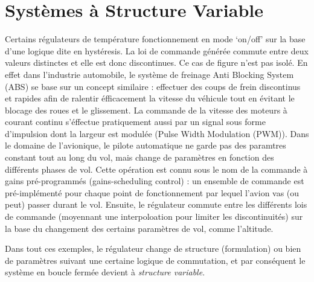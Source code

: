 \section{Systèmes à Structure Variable}
Certains régulateurs de température fonctionnement en mode ‘on/off’ sur la base d'une logique dite en  hystéresis. La loi de commande générée commute entre deux valeurs distinctes et elle est donc discontinues. Ce cas de figure n'est pas isolé. En effet dans l'industrie automobile, le système de freinage Anti Blocking System (ABS) se base sur un concept similaire : effectuer des coups de frein discontinus et rapides afin de ralentir éfficacement la vitesse du véhicule tout en évitant le blocage des roues et le glissement. La commande de la vitesse des moteurs à courant continu s'éffectue pratiquement aussi par un signal sous forme d'impulsion dont la largeur est modulée (Pulse Width Modulation (PWM)). Dans le domaine de l'avionique, le pilote automatique ne garde pas des paramtres constant tout au long du vol, mais change de paramètres en fonction des différents phases de vol. Cette opération est connu sous le nom  de la commande à gains pré-programmés (gains-scheduling control) : un ensemble de commande est pré-implémenté pour chaque point de fonctionnement par lequel l'avion vas (ou peut) passer durant le vol. Ensuite, le régulateur commute entre les différents lois de commande (moyennant une interpoloation pour limiter les discontinuités) sur la base du changement des certains paramètres de vol, comme l'altitude.  

Dans tout ces exemples, le régulateur change de structure (formulation) ou bien de paramètres suivant une certaine logique de commutation, et par conséquent le système en boucle fermée devient à \emph{structure variable}.
